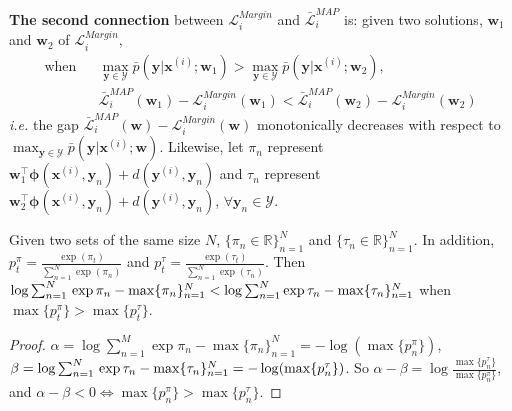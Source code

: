 \textbf{The second connection} between $\mathcal{L}^{Margin}_i$ and $\bar{\mathcal{L}}^{MAP}_i$ is:  
given two solutions, $\mathbf{w}_1$  and $\mathbf{w}_2$ of $\mathcal{L}_i^{Margin}$,  
\begin{equation}
    \begin{array}{rcl}
        \text{when} & &\max_{\mathbf{y}\in\mathcal{Y}}\bar{p}(\mathbf{y}|\mathbf{x}^{(i)};\mathbf{w}_1)> \max_{\mathbf{y}\in\mathcal{Y}}\bar{p}(\mathbf{y}|\mathbf{x}^{(i)};\mathbf{w}_2),\\ 
                    & &\bar{\mathcal{L}}_i^{MAP}(\mathbf{w}_1)-\mathcal{L}_i^{Margin}(\mathbf{w}_1) < \bar{\mathcal{L}}_i^{MAP}(\mathbf{w}_2)-\mathcal{L}_i^{Margin}(\mathbf{w}_2) 
    \end{array}
\label{equ:monotomic}
\end{equation}
\emph{i.e.} the gap $\bar{\mathcal{L}}_i^{MAP}(\mathbf{w})-\mathcal{L}_i^{Margin}(\mathbf{w})$ monotonically decreases with respect to $\max_{\mathbf{y}\in\mathcal{Y}}\bar{p}(\mathbf{y}|\mathbf{x}^{(i)};\mathbf{w})$. 
Likewise, let $\pi_n$ represent  
$\mathbf{w}_1^\top \boldsymbol{\phi}(\mathbf{x}^{(i)},\mathbf{y}_n)+d(\mathbf{y}^{(i)},\mathbf{y}_n)$ and $\tau_n$ represent 
$\mathbf{w}_2^\top \boldsymbol{\phi}(\mathbf{x}^{(i)},\mathbf{y}_n)+d(\mathbf{y}^{(i)},\mathbf{y}_n)$, $\forall \mathbf{y}_n\in\mathcal{Y}$. 
\begin{proposition}
    Given two sets of the same size $N$, $\{\pi_n\in\mathbb{R}\}_{n=1}^N$ and $\{\tau_n\in\mathbb{R}\}_{n=1}^N$. In addition, $p_t^\pi=\frac{\exp(\pi_t)}{\sum_{n=1}^N\exp(\pi_n)}$ 
    and $p_t^\tau=\frac{\exp(\tau_t)}{\sum_{n=1}^N\exp(\tau_n)}$. Then $\log\sum_{n=1}^N\\ \exp{\pi_n}-\max\{\pi_n\}_{n=1}^N< \log\sum_{n=1}^N \exp{\tau_n}-\max\{\tau_n\}_{n=1}^N$ when 
    $\max\{ p_t^\pi\}>\max\{ p_t^\tau\}$.   
\label{pro:monotomic}
\end{proposition}
\begin{proof}
    $\alpha=\log \sum_{n=1}^M \exp{\pi_n}-\max\{\pi_n\}_{n=1}^N=-\log (\max\{p^\pi_n\})$, $\beta=\log \sum_{n=1}^N\\\exp{\tau_n}-\max\{\tau_n\}_{n=1}^N=-\log (\max\{p^\tau_n\})$. So $\alpha-\beta=
    \log \frac{\max \{p^\tau_n\}}{\max \{p^\pi_n\}}$, and $\alpha-\beta<0 \Leftrightarrow \max \{p^\pi_n\}>\max \{p^\tau_n\}$.     
\end{proof}


